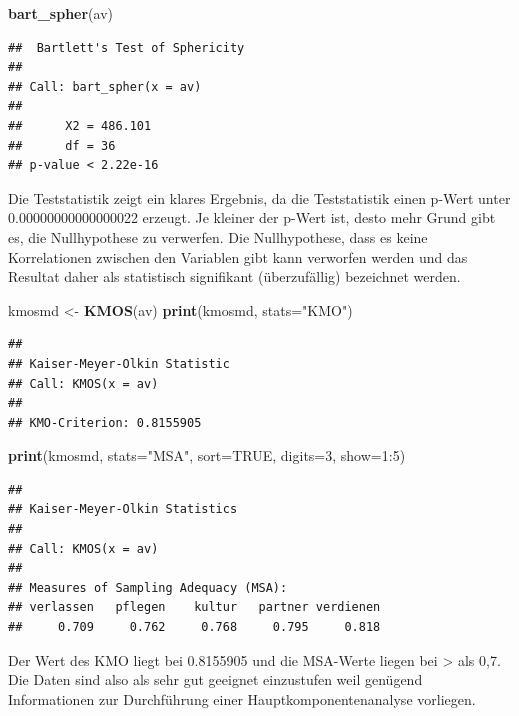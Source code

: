 \documentclass[]{article}
\newenvironment{Shaded}{\begin{snugshade}}{\end{snugshade}}
\newcommand{\KeywordTok}[1]{\textcolor[rgb]{0.13,0.29,0.53}{\textbf{{#1}}}}
\newcommand{\DataTypeTok}[1]{\textcolor[rgb]{0.13,0.29,0.53}{{#1}}}
\newcommand{\DecValTok}[1]{\textcolor[rgb]{0.00,0.00,0.81}{{#1}}}
\newcommand{\StringTok}[1]{\textcolor[rgb]{0.31,0.60,0.02}{{#1}}}
\newcommand{\OtherTok}[1]{\textcolor[rgb]{0.56,0.35,0.01}{{#1}}}
\newcommand{\NormalTok}[1]{{#1}}
\begin{document}
\begin{Shaded}
\begin{Highlighting}[]
\KeywordTok{bart_spher}\NormalTok{(av)}
\end{Highlighting}
\end{Shaded}

\begin{verbatim}
##  Bartlett's Test of Sphericity
## 
## Call: bart_spher(x = av)
## 
##      X2 = 486.101
##      df = 36
## p-value < 2.22e-16
\end{verbatim}

Die Teststatistik zeigt ein klares Ergebnis, da die Teststatistik einen
p-Wert unter 0.00000000000000022 erzeugt. Je kleiner der p-Wert ist,
desto mehr Grund gibt es, die Nullhypothese zu verwerfen. Die
Nullhypothese, dass es keine Korrelationen zwischen den Variablen gibt
kann verworfen werden und das Resultat daher als statistisch signifikant
(überzufällig) bezeichnet werden.

\begin{Shaded}
\begin{Highlighting}[]
\NormalTok{kmosmd <-}\StringTok{ }\KeywordTok{KMOS}\NormalTok{(av)}
\KeywordTok{print}\NormalTok{(kmosmd, }\DataTypeTok{stats=}\StringTok{"KMO"}\NormalTok{)}
\end{Highlighting}
\end{Shaded}

\begin{verbatim}
## 
## Kaiser-Meyer-Olkin Statistic
## Call: KMOS(x = av)
## 
## KMO-Criterion: 0.8155905
\end{verbatim}

\begin{Shaded}
\begin{Highlighting}[]
\KeywordTok{print}\NormalTok{(kmosmd, }\DataTypeTok{stats=}\StringTok{"MSA"}\NormalTok{, }\DataTypeTok{sort=}\OtherTok{TRUE}\NormalTok{, }\DataTypeTok{digits=}\DecValTok{3}\NormalTok{, }\DataTypeTok{show=}\DecValTok{1}\NormalTok{:}\DecValTok{5}\NormalTok{)}
\end{Highlighting}
\end{Shaded}

\begin{verbatim}
## 
## Kaiser-Meyer-Olkin Statistics
## 
## Call: KMOS(x = av)
## 
## Measures of Sampling Adequacy (MSA):
## verlassen   pflegen    kultur   partner verdienen 
##     0.709     0.762     0.768     0.795     0.818
\end{verbatim}

Der Wert des KMO liegt bei 0.8155905 und die MSA-Werte liegen bei
\textgreater{} als 0,7. Die Daten sind also als sehr gut geeignet
einzustufen weil genügend Informationen zur Durchführung einer
Hauptkomponentenanalyse vorliegen.
\end{document}
